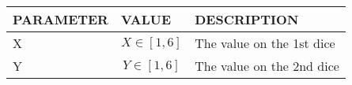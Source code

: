 

\begin{tabular}{|l|l|l|}
\hline
PARAMETER	& VALUE	                & DESCRIPTION\\
\hline
X               & $$X \in [1,6]$$	& The value on the 1st dice \\
\hline
Y        	& $$Y \in [1,6]$$	& The value on the 2nd dice\\
\hline
\end{tabular}


